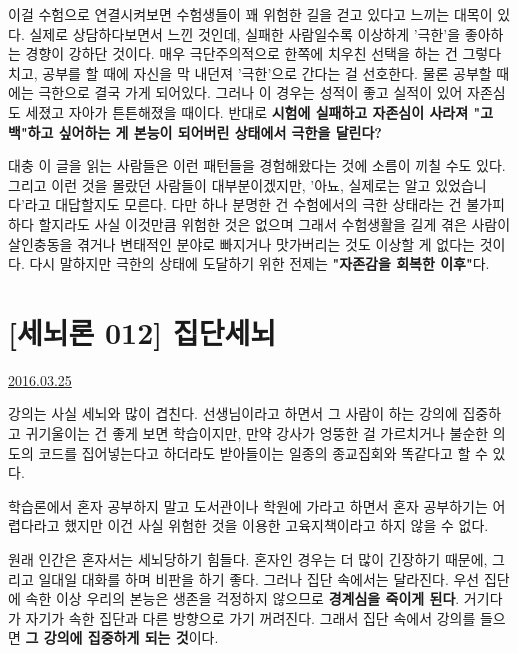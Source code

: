 이걸 수험으로 연결시켜보면 수험생들이 꽤 위험한 길을 걷고 있다고 느끼는 대목이 있다.
실제로 상담하다보면서 느낀 것인데, 실패한 사람일수록 이상하게 '극한'을 좋아하는 경향이 강하단 것이다.
매우 극단주의적으로 한쪽에 치우친 선택을 하는 건 그렇다 치고, 공부를 할 때에 자신을 막 내던져 '극한'으로 간다는 걸 선호한다.
물론 공부할 때에는 극한으로 결국 가게 되어있다. 그러나 이 경우는 성적이 좋고 실적이 있어 자존심도 세졌고 자아가 튼튼해졌을 때이다.
반대로 \textbf{시험에 실패하고 자존심이 사라져 "고백"하고 싶어하는 게 본능이 되어버린 상태에서 극한을 달린다?}
\vspace{5mm}

대충 이 글을 읽는 사람들은 이런 패턴들을 경험해왔다는 것에 소름이 끼칠 수도 있다.
그리고 이런 것을 몰랐던 사람들이 대부분이겠지만, '아뇨, 실제로는 알고 있었습니다'라고 대답할지도 모른다.
다만 하나 분명한 건 수험에서의 극한 상태라는 건 불가피하다 할지라도 사실 이것만큼 위험한 것은 없으며
그래서 수험생활을 길게 겪은 사람이 살인충동을 겪거나 변태적인 분야로 빠지거나 맛가버리는 것도 이상할 게 없다는 것이다.
다시 말하지만 극한의 상태에 도달하기 위한 전제는 \textbf{"자존감을 회복한 이후"}다.
\vspace{5mm}






\section{[세뇌론 012] 집단세뇌}
\href{https://www.kockoc.com/Apoc/694295}{2016.03.25}

\vspace{5mm}

강의는 사실 세뇌와 많이 겹친다.
선생님이라고 하면서 그 사람이 하는 강의에 집중하고 귀기울이는 건 좋게 보면 학습이지만,
만약 강사가 엉뚱한 걸 가르치거나 불순한 의도의 코드를 집어넣는다고 하더라도 받아들이는 일종의 종교집회와 똑같다고 할 수 있다.
\vspace{5mm}

학습론에서 혼자 공부하지 말고 도서관이나 학원에 가라고 하면서 혼자 공부하기는 어렵다라고 했지만
이건 사실 위험한 것을 이용한 고육지책이라고 하지 않을 수 없다.
\vspace{5mm}

원래 인간은 혼자서는 세뇌당하기 힘들다. 혼자인 경우는 더 많이 긴장하기 때문에, 그리고 일대일 대화를 하며 비판을 하기 좋다.
그러나 집단 속에서는 달라진다. 우선 집단에 속한 이상 우리의 본능은 생존을 걱정하지 않으므로 \textbf{경계심을 죽이게 된다}.
거기다가 자기가 속한 집단과 다른 방향으로 가기 꺼려진다. 그래서 집단 속에서 강의를 들으면 \textbf{그 강의에 집중하게 되는 것}이다.
\vspace{5mm}

